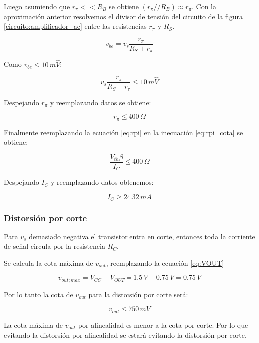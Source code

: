 \documentclass[10pt,spanish,a4paper,openany,notitlepage]{article}
\begin{document}
Luego asumiendo que $r_\pi << R_B$ se obtiene $(r_\pi // R_B) \approx r_\pi$.
Con la aproximación anterior resolvemos el divisor de tensión del circuito
de la figura \ref{circuito:amplificador_ac} entre las resistencias $r_\pi$
y $R_S$.

\[ \displaystyle v_{be} = v_s \frac{r_\pi}{R_S + r_\pi} \]

Como $v_{be} \leqslant 10\, \unit{m\widehat{V}}$:

\[ \displaystyle v_s \frac{r_\pi}{R_S + r_\pi} \leqslant 10\,\unit{m\widehat{V}}\]

Despejando $r_\pi$ y reemplazando datos se obtiene:

\begin{equation}
r_\pi \leqslant 400\, \unit{\Omega}
\label{eq:rpi_cota}
\end{equation}

Finalmente reemplazando la ecuación \ref{eq:rpi} en la inecuación \ref{eq:rpi_cota}
se obtiene:

\[ \displaystyle \frac{V_{th} \beta}{I_C} \leqslant 400\, \unit{\Omega} \]

Despejando $I_C$ y reemplazando datos obtenemos:

\begin{equation}
I_C \geqslant 24.32\, \unit{mA}
\label{eq:IC_alinealidad}
\end{equation}

\subsubsection{Distorsión por corte}

Para $v_s$ demasiado negativa el transistor entra en corte, entonces
toda la corriente de señal circula por la resistencia $R_C$.

Se calcula la cota máxima de $v_{out}$, reemplazando la ecuación \ref{eq:VOUT}

\[ \displaystyle v_{out;max} = V_{CC} - V_{OUT} = 1.5\, \unit{V} - 0.75\, \unit{V} = 0.75\, \unit{V} \]

Por lo tanto la cota de $v_{out}$ para la distorsión por corte será:

\begin{equation}
v_{out} \leqslant 750\, \unit{mV}
\label{eq:vout_corte}
\end{equation}

La cota máxima de $v_{out}$ por alinealidad es menor a la cota por corte. Por
lo que evitando la distorsión por alinealidad se estará evitando la
distorsión por corte.
\end{document}
